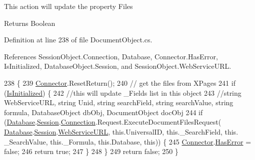 This action will update the property \textquotesingle{}Files\textquotesingle{}

\begin{DoxyReturn}{Returns}
Boolean
\end{DoxyReturn}


Definition at line 238 of file Document\+Object.\+cs.



References Session\+Object.\+Connection, Database, Connector.\+Has\+Error, Is\+Initialized, Database\+Object.\+Session, and Session\+Object.\+Web\+Service\+U\+RL.


\begin{DoxyCode}
238                            \{
239         \mbox{\hyperlink{class_connector}{Connector}}.ResetReturn();
240         \textcolor{comment}{// get the files from XPages}
241         \textcolor{keywordflow}{if} (\mbox{\hyperlink{class_document_object_a3b2075b73f38d05091b69decc6ce7992}{IsInitialized}}) \{
242             \textcolor{comment}{//this will update \_Fields list in this object}
243             \textcolor{comment}{//string WebServiceURL, string Unid, string searchField, string searchValue, string formula,
       DatabaseObject dbObj, DocumentObject docObj}
244             \textcolor{keywordflow}{if} (\mbox{\hyperlink{class_document_object_a69d5338c9835f748490323d2950eed09}{Database}}.\mbox{\hyperlink{class_database_object_aa8484162b7d2a7c4c9426bca13c64c07}{Session}}.\mbox{\hyperlink{class_session_object_a014bdbf705a753540e19bfb53030c55c}{Connection}}.Request.ExecuteDocumentFilesRequest(
      \mbox{\hyperlink{class_document_object_a69d5338c9835f748490323d2950eed09}{Database}}.\mbox{\hyperlink{class_database_object_aa8484162b7d2a7c4c9426bca13c64c07}{Session}}.\mbox{\hyperlink{class_session_object_a697c071c812fbf7ad1166b896fb44c16}{WebServiceURL}}, \textcolor{keyword}{this}.UniversalID, \textcolor{keyword}{this}.\_SearchField, \textcolor{keyword}{this}.
      \_SearchValue, \textcolor{keyword}{this}.\_Formula, \textcolor{keyword}{this}.Database, \textcolor{keyword}{this})) \{
245                 \mbox{\hyperlink{class_connector}{Connector}}.\mbox{\hyperlink{class_connector_a9365777a6b7b711b75bcfa6c4d53e989}{HasError}} = \textcolor{keyword}{false};
246                 \textcolor{keywordflow}{return} \textcolor{keyword}{true};
247             \}
248         \}
249         \textcolor{keywordflow}{return} \textcolor{keyword}{false};
250     \}
\end{DoxyCode}
\mbox{\label{class_document_object_af4298d6cfbb9ea60643d9995309b73f1}} 
